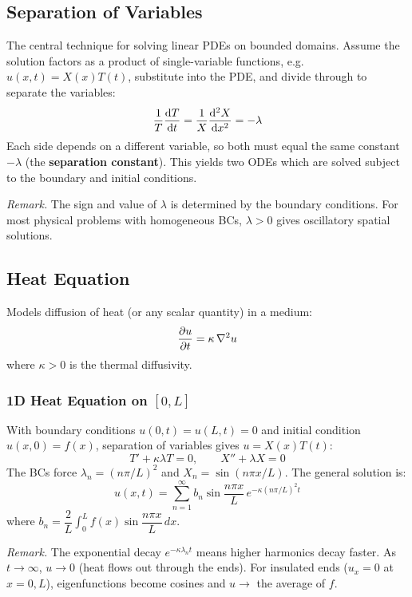 \documentclass[11pt, letterpaper]{article}
\theoremstyle{plain}
\newenvironment{remark}{\smallskip\noindent\textit{Remark.}}{\smallskip}
\begin{document}
\subsection{Separation of Variables}

The central technique for solving linear PDEs on bounded domains.
Assume the solution factors as a product of single-variable functions,
e.g.\ $u(x,t) = X(x)T(t)$, substitute into the PDE, and divide through
to separate the variables:
\[
    \frac{1}{T}\dv{T}{t} = \frac{1}{X}\dv[2]{X}{x} = -\lambda
\]
Each side depends on a different variable, so both must equal the same
constant $-\lambda$ (the \textbf{separation constant}). This yields two ODEs
which are solved subject to the boundary and initial conditions.

\begin{remark}
    The sign and value of $\lambda$ is determined by the boundary conditions.
    For most physical problems with homogeneous BCs, $\lambda > 0$ gives
    oscillatory spatial solutions.
\end{remark}


\subsection{Heat Equation}

Models diffusion of heat (or any scalar quantity) in a medium:
\[
    \pdv{u}{t} = \kappa\,\nabla^2 u
\]
where $\kappa > 0$ is the thermal diffusivity.

\subsubsection*{1D Heat Equation on $[0,L]$}
With boundary conditions $u(0,t) = u(L,t) = 0$ and initial condition
$u(x,0) = f(x)$, separation of variables gives $u = X(x)T(t)$:
\[
    T' + \kappa\lambda T = 0, \qquad X'' + \lambda X = 0
\]
The BCs force $\lambda_n = (n\pi/L)^2$ and $X_n = \sin(n\pi x/L)$.
The general solution is:
\[
    u(x,t) = \sum_{n=1}^{\infty} b_n \sin\frac{n\pi x}{L}\,
              e^{-\kappa(n\pi/L)^2 t}
\]
where $b_n = \dfrac{2}{L}\displaystyle\int_0^L f(x)\sin\dfrac{n\pi x}{L}\,dx$.

\begin{remark}
    The exponential decay $e^{-\kappa\lambda_n t}$ means higher harmonics
    decay faster. As $t\to\infty$, $u\to 0$ (heat flows out through the ends).
    For insulated ends ($u_x = 0$ at $x=0,L$), eigenfunctions become cosines
    and $u\to$ the average of $f$.
\end{remark}
\end{document}
